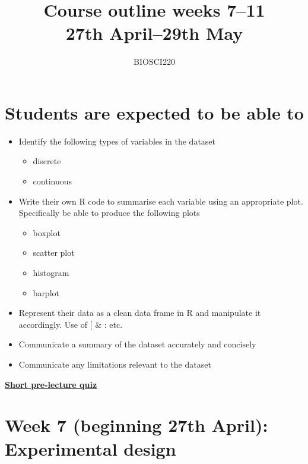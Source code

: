 \documentclass{article}
\begin{document}
\title{Course outline weeks 7--11\\ 27th April--29th May}
\author{BIOSCI220}
\date{}
\maketitle


\section*{Students are expected to be able to}
\begin{itemize}
\item Identify the following types of variables in the dataset
  \begin{itemize}
  \item discrete
  \item continuous
  \end{itemize}
\item Write their own R code to summarise each variable using an appropriate plot. Specifically be able to produce the following plots
  \begin{itemize}
  \item boxplot
  \item scatter plot
  \item histogram
  \item barplot
  \end{itemize}
\item Represent their data as a clean data frame in R and manipulate it accordingly. Use of [ \& : etc.
\item Communicate a summary of the dataset accurately and concisely
\item Communicate any limitations relevant to the dataset
\end{itemize}

\begin{center}
\href{https://docs.google.com/forms/d/e/1FAIpQLSfQgNKk9yBFPOwhL2zv7xttnYsuw1f-FiMaP7SSUYzM7LzTJw/viewform?usp=sf_link}{\textbf{\Large Short pre-lecture quiz}}
\end{center}

\section*{Week 7 (beginning 27th April):  Experimental design}
\end{document}
